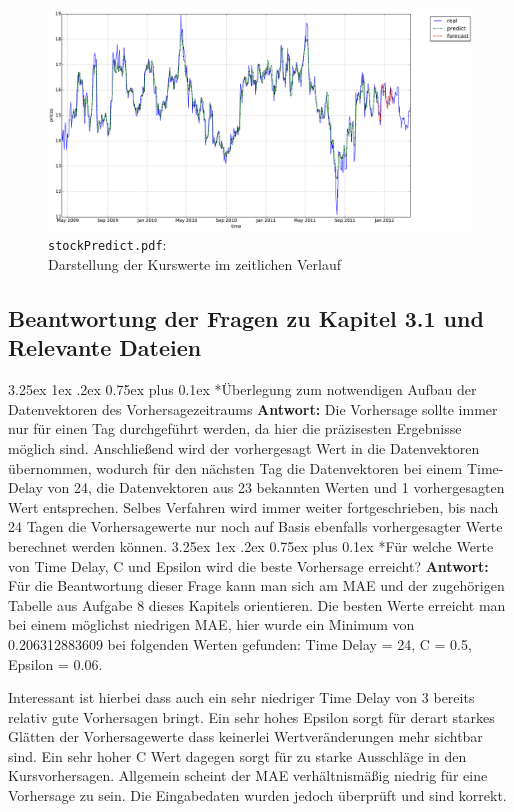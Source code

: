 \documentclass[12pt,a4paper]{scrartcl}
\makeatletter
\renewcommand\subparagraph{\@startsection{subparagraph}{5}{\parindent}%
    {3.25ex \@plus1ex \@minus .2ex}%
    {0.75ex plus 0.1ex}%
    {\normalfont\normalsize\bfseries}}
\makeatother
\begin{document}
\begin{figure}[!h]
    \includegraphics[width=\textwidth]{Plots/stockPredict.pdf}
    \caption{\lstinline{stockPredict.pdf}: \\ Darstellung der Kurswerte im zeitlichen Verlauf}
\end{figure}
\subsection*{Beantwortung der Fragen zu Kapitel 3.1 und Relevante Dateien}

\subparagraph*{Überlegung zum notwendigen Aufbau der Datenvektoren des Vorhersagezeitraums}
\textbf{Antwort:} Die Vorhersage sollte immer nur für einen Tag durchgeführt werden, da hier
die präzisesten Ergebnisse möglich sind. Anschließend wird der vorhergesagt Wert in die Datenvektoren
übernommen, wodurch für den nächsten Tag die Datenvektoren bei einem Time-Delay von 24, die Datenvektoren
aus 23 bekannten Werten und 1 vorhergesagten Wert entsprechen. Selbes Verfahren wird immer weiter fortgeschrieben,
bis nach 24 Tagen die Vorhersagewerte nur noch auf Basis ebenfalls vorhergesagter Werte berechnet werden können.
\newpage
\subparagraph*{Für welche Werte von Time Delay, C und Epsilon wird die beste Vorhersage erreicht?}
\textbf{Antwort:} Für die Beantwortung dieser Frage kann man sich am MAE und der zugehörigen Tabelle aus Aufgabe 8 dieses
Kapitels orientieren. Die besten Werte erreicht man bei einem möglichst niedrigen MAE, hier wurde ein Minimum von 0.206312883609
bei folgenden Werten gefunden: Time Delay = 24, C = 0.5, Epsilon = 0.06.

Interessant ist hierbei dass auch ein sehr niedriger Time Delay von 3 bereits relativ gute Vorhersagen bringt.
Ein sehr hohes Epsilon sorgt für derart starkes Glätten der Vorhersagewerte dass keinerlei Wertveränderungen
mehr sichtbar sind. Ein sehr hoher C Wert dagegen sorgt für zu starke Ausschläge in den Kursvorhersagen.
Allgemein scheint der MAE verhältnismäßig niedrig für eine Vorhersage zu sein. Die Eingabedaten wurden jedoch
überprüft und sind korrekt. 
\end{document}
